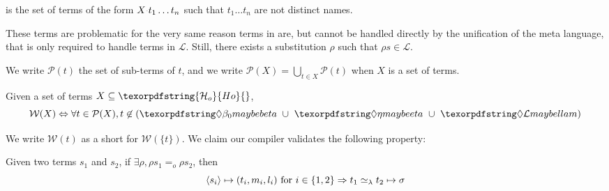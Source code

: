 \documentclass[sigconf,natbib=false,review]{acmart}
\newcommand{\appsep}{\ensuremath{\textcolor{lightgray}{\cdot}}}
\newcommand{\EqualRel}{\ensuremath{=}}
\newcommand{\UnifRel}{\ensuremath{\simeq}}
\newcommand{\Eo}{\ensuremath{\EqualRel_o}\xspace}
\newcommand{\Ue}{\ensuremath{\UnifRel_\lambda}\xspace}
\newcommand{\llambda}{\ensuremath{\mathcal{L}}\xspace}
\newcommand{\Ho}{\texorpdfstring{\ensuremath{\mathcal{H}_o}\xspace}{Ho}}
\begin{document}
\begin{definition}[\notllambda]\label{def:notllambda}
  \notllambda is the set of terms of the form $X \appsep t_1 \ldots t_n$
  such that $t_1 \ldots t_n$ are not distinct names.
\end{definition}

\noindent
These terms are problematic for the very same reason terms in \maybebeta are,
but cannot be handled directly by the unification of the meta language, that
is only required to handle terms in \llambda. Still, there exists a
substitution $\rho$ such that $\rho s \in \llambda$.


\newcommand{\subterm}[1]{\ensuremath{\mathcal{P}(#1)}}
We write $\subterm{t}$ the set of sub-terms of $t$, and
we write $\subterm{X} = \bigcup_{t\in X} \subterm{t}$ when $X$ is a set of terms.

\newcommand{\wellb}{\ensuremath{\mathcal{W}}\xspace}
\begin{definition}
Given a set of terms $X \subseteq \Ho{}$,
$$
\wellb(X) \Leftrightarrow \forall t \in \subterm{X},
t \not\in (\maybebeta{} ~\cup~ \maybeeta{} ~\cup~ \notllambda{})
$$
\end{definition}

\noindent
We write $\wellb(t)$ as a short for $\wellb(\{t\})$.
We claim our compiler validates the following property: 

\begin{proposition}[\wellb-enforcing]\label{prop:w-enforcing}
  Given two terms $s_1$ and $s_2$, if $\exists \rho, \rho s_1 \Eo \rho s_2$,
  then 
  $$
    \C{s_i}{t_i}{m_i}{l_i} ~\mathrm{for}~ i \in \{ 1,2 \} \Rightarrow
    t_1 \Ue t_2 \mapsto \sigma \label{prop:compilation-w}
  $$
\end{proposition}
\end{document}
